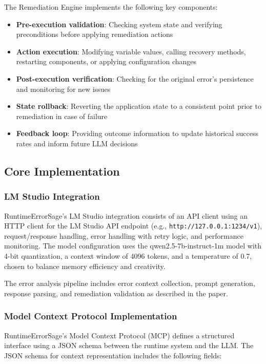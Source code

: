 The Remediation Engine implements the following key components:

\begin{itemize}
\item \textbf{Pre-execution validation}: Checking system state and verifying preconditions before applying remediation actions
\item \textbf{Action execution}: Modifying variable values, calling recovery methods, restarting components, or applying configuration changes
\item \textbf{Post-execution verification}: Checking for the original error's persistence and monitoring for new issues
\item \textbf{State rollback}: Reverting the application state to a consistent point prior to remediation in case of failure
\item \textbf{Feedback loop}: Providing outcome information to update historical success rates and inform future LLM decisions
\end{itemize}

\subsection{Core Implementation}

\subsubsection{LM Studio Integration}
RuntimeErrorSage's LM Studio integration consists of an API client using an HTTP client for the LM Studio API endpoint (e.g., \texttt{http://127.0.0.1:1234/v1}), request/response handling, error handling with retry logic, and performance monitoring. The model configuration uses the qwen2.5-7b-instruct-1m model with 4-bit quantization, a context window of 4096 tokens, and a temperature of 0.7, chosen to balance memory efficiency and creativity.

The error analysis pipeline includes error context collection, prompt generation, response parsing, and remediation validation as described in the paper.

\subsubsection{Model Context Protocol Implementation}
RuntimeErrorSage's Model Context Protocol (MCP) defines a structured interface using a JSON schema between the runtime system and the LLM. The JSON schema for context representation includes the following fields:

